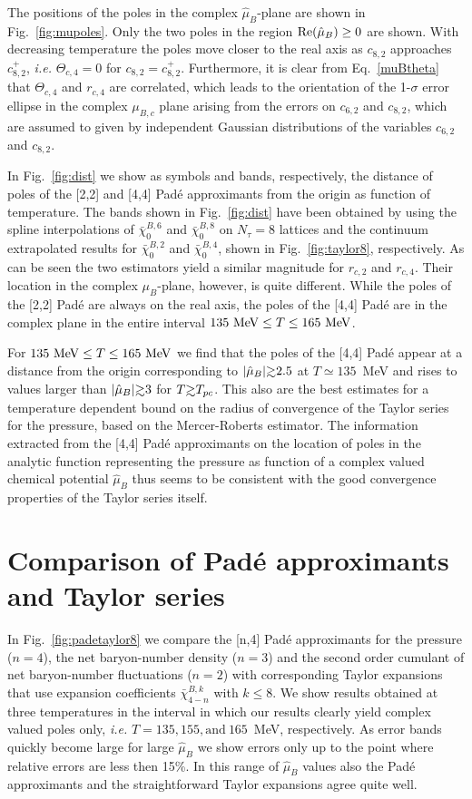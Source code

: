 \documentclass[pdflatex,prd,twocolumn,showpacs,superscriptaddress,nofootinbib]{revtex4-1}
\def\gsim{\raise0.3ex\hbox{$>$\kern-0.75em\raise-1.1ex\hbox{$\sim$}}}
\newcommand \hmu {\hat{\mu}}
\newcommand \cb {\bar{\chi}}
\begin{document}
The positions of the poles in the complex $\hmu_B$-plane are shown in Fig.~\ref{fig:mupoles}. Only the two poles in the region ${\rm Re}(\hmu_B)\ge 0$ are shown. With decreasing temperature the poles 
move closer to the real axis as $c_{8,2}$ approaches
$c_{8,2}^+$, {\it i.e.} $\Theta_{c,4}=0$ for $c_{8,2}=c_{8,2}^+$. Furthermore, it is clear from 
Eq.~\ref{muBtheta} that $\Theta_{c,4}$ and $r_{c,4}$
are correlated, which leads to the orientation of the
1-$\sigma$ error ellipse in the complex $\mu_{B,c}$
plane arising from the errors on $c_{6,2}$ and $c_{8,2}$, which are assumed to given by independent Gaussian distributions of the variables
$c_{6,2}$ and $c_{8,2}$.

In Fig.~\ref{fig:dist} we show as symbols and bands, respectively, the distance of poles of the [2,2] and [4,4] Pad\'e approximants
from the origin as function of temperature. 
The bands shown in Fig.~\ref{fig:dist} have been obtained by using the spline interpolations of $\cb_0^{B,6}$ and $\cb_0^{B,8}$ on $N_\tau=8$ lattices and the
continuum extrapolated results for $\cb_0^{B,2}$ and $\cb_0^{B,4}$,
shown in Fig.~\ref{fig:taylor8}, respectively.
As can be seen the two estimators yield a similar magnitude for $r_{c,2}$ and $r_{c,4}$.
Their location in the complex $\mu_B$-plane, however, 
is quite different. While the poles of the [2,2]
Pad\'e are always on the real axis, the poles of the
[4,4] Pad\'e are in the complex plane in the entire
interval $135~{\rm MeV}\le T\le 165~{\rm MeV}$.

For $135~{\rm MeV}\le T\le  165~{\rm MeV}$ we find that the poles of the [4,4] Pad\'e appear at a distance from the origin corresponding to $|\hmu_B| \gsim 2.5$ at $T\simeq 135$~MeV and rises to values larger than $|\hmu_B| \gsim 3$ for $T\gsim T_{pc}$. 
This also are the best estimates for a temperature dependent bound on the radius of convergence of the 
Taylor series for the pressure,
based on the Mercer-Roberts estimator. The information
extracted from the [4,4] Pad\'e approximants on the 
location of poles in the analytic function representing the pressure as function of a complex valued chemical potential $\hmu_B$ thus seems to be consistent with the good convergence properties of the Taylor series itself.


\section{Comparison of Pad\'e approximants and Taylor series}
\label{sec:compare}
In Fig.~\ref{fig:padetaylor8} we compare the [n,4]
Pad\'e approximants for the pressure ($n=4$), the net baryon-number density ($n=3$) and the second order cumulant of net baryon-number fluctuations ($n=2$) with corresponding Taylor expansions that use expansion
coefficients
$\cb_{4-n}^{B,k}$ with $k\le 8$. We show results
obtained at three temperatures in the interval in which 
our results clearly yield complex valued
poles only, {\it i.e.} $T=135, 155, \text{and} \ 165$~MeV,
respectively. As error bands quickly become large for large $\hmu_B$ we show errors only up to the point where relative errors are less then 15\%. In this range of $\hmu_B$ values also the Pad\'e approximants and the straightforward Taylor expansions agree quite well. 
 
\end{document}
